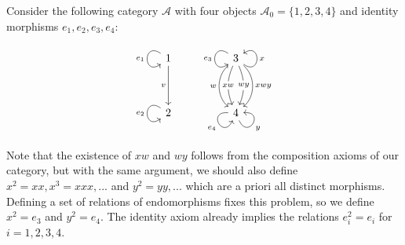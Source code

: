 \begin{example}
Consider the following category $\mathcal{A}$ with four objects $\mathcal{A}_{0} = \{1,2,3,4\}$ and
identity morphisms $e_{1}, e_{2}, e_{3}, e_{4}$:
\[
\begin{tikzcd}
1 \arrow["e_{1}"', loop, distance=2em, in=215, out=145] \arrow[dd, "v"'] &  & 3 \arrow["x"', loop, distance=2em, in=35, out=325] \arrow["e_{3}"', loop, distance=2em, in=215, out=145] \arrow[dd, "w"', bend right=49] \arrow[dd, "xw" description, bend right=23] \arrow[dd, "wy" description, bend left=23] \arrow[dd, "xwy", bend left=49] \\
                                                                         &  &                                                                                                                                                                                                                                                           \\
2 \arrow["e_{2}"', loop, distance=2em, in=215, out=145]                  &  & 4 \arrow["y"', loop, distance=2em, in=5, out=295] \arrow["e_4"', loop, distance=2em, in=245, out=175]                                                                                                                                                   
\end{tikzcd}
\]
Note that the existence of $xw$ and $wy$ follows from the composition axioms of our category, but with the same argument,
we should also define $x^{2} = xx, x^{3} = xxx, ... $ and $y^{2} = yy, ... $ which are a priori all distinct morphisms.
Defining a set of relations of endomorphisms fixes this problem, so we define $x^{2} = e_{3}$ and $y^{2} = e_{4}$.
The identity axiom already implies the relations $e_{i}^{2} = e_{i}$ for $i = 1,2,3,4$.


\end{example}
